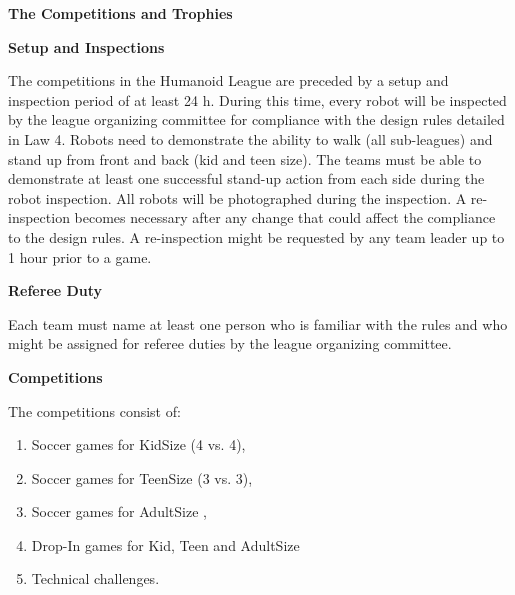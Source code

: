 \clearpage
\sffamily
{\bfseries\color[rgb]{0.4,0.4,0.4}The Competitions and Trophies}
{}


\bigskip

{\bfseries Setup and Inspections}

\headlinebox

The competitions in the Humanoid League are preceded by a setup and inspection period of at least 24 h. During this time, every robot will be inspected by the league organizing committee for compliance with the design rules detailed in Law 4. Robots need to demonstrate the ability to walk (all sub-leagues) and stand up from front and back (kid and teen size). The teams must be able to demonstrate at least one successful stand-up action from each side during the robot inspection. All robots will be photographed during the inspection. A re-inspection becomes necessary after any change that could affect the compliance to the design rules. A re-inspection might be requested by any team leader up to 1 hour prior to a game.

\bigskip

{\bfseries Referee Duty}

\headlinebox

Each team must name at least one person who is familiar with the rules and who might be assigned for referee duties  by the league organizing committee.

\bigskip

{\bfseries Competitions}

\headlinebox

The competitions consist of:

\begin{enumerate}
\item Soccer games for KidSize (4 vs. 4),
\item Soccer games for TeenSize (3 vs. 3),
\item Soccer games for AdultSize  ,
\item Drop-In games for Kid, Teen and AdultSize
\item Technical challenges.
\end{enumerate}

\bigskip


